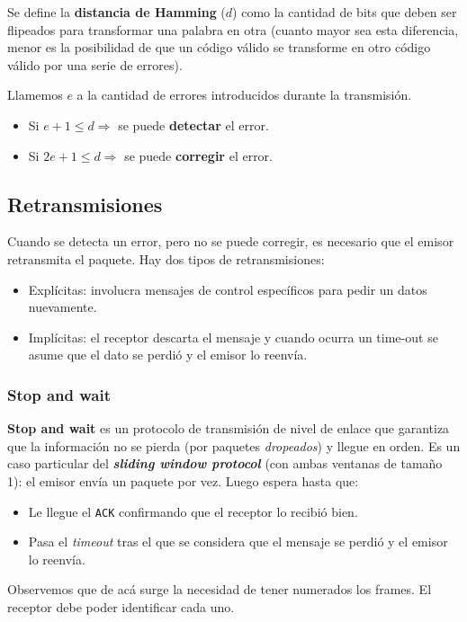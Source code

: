 \documentclass[]{article}
\begin{document}
Se define la \textbf{distancia de Hamming} ($d$) como la cantidad de bits que deben ser flipeados para transformar una palabra en otra (cuanto mayor sea esta diferencia, menor es la posibilidad de que un código válido se transforme en otro código válido por una serie de errores).

Llamemos $e$ a la cantidad de errores introducidos durante la transmisión.
\begin{itemize}
    \item Si $e + 1 \leq d \Rightarrow$ se puede \textbf{detectar} el error.
    \item Si $2e + 1 \leq d \Rightarrow$ se puede \textbf{corregir} el error.
\end{itemize}

\subsection{Retransmisiones}
Cuando se detecta un error, pero no se puede corregir, es necesario que el emisor retransmita el paquete. Hay dos tipos de retransmisiones:
\begin{itemize}
    \item Explícitas: involucra mensajes de control específicos para pedir un datos nuevamente.
    \item Implícitas: el receptor descarta el mensaje y cuando ocurra un time-out se asume que el dato se perdió y el emisor lo reenvía.
\end{itemize}

\subsubsection{Stop and wait}
\textbf{Stop and wait} es un protocolo de transmisión de nivel de enlace que garantiza que la información no se pierda (por paquetes \emph{dropeados}) y llegue en orden. Es un caso particular del \emph{\textbf{sliding window protocol}} (con ambas ventanas de tamaño 1): el emisor envía un paquete por vez. Luego espera hasta que:
\begin{itemize}
    \item Le llegue el \texttt{ACK} confirmando que el receptor lo recibió bien.
    \item Pasa el \emph{timeout} tras el que se considera que el mensaje se perdió y el emisor lo reenvía.
\end{itemize}

Observemos que de acá surge la necesidad de tener numerados los frames. El receptor debe poder identificar cada uno.
\end{document}
